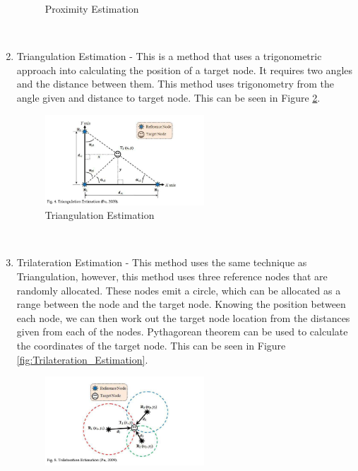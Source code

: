 \documentclass{report}
\begin{document}
\begin{enumerate}
\begin{figure}[h!]
    \caption{Proximity Estimation\cite{IndoorTrackingRSSI}}
    \label{fig:Proximity Estimation Diagram}
\end{figure} \\
    \item Triangulation Estimation - This is a method that uses a trigonometric approach into calculating the position of a target node. It requires two angles and the distance between them. This method uses trigonometry from the angle given and distance to target node. This can be seen in Figure \ref{fig:Triangulation Estimation Diagram}.
\begin{figure}[h!]
    \centering
    \includegraphics[width=225]{Triangulation_estimation.PNG} 
    \caption{Triangulation Estimation\cite{IndoorTrackingRSSI}}
    \label{fig:Triangulation Estimation Diagram}
\end{figure} \\
    \item Trilateration Estimation - This method uses the same technique as Triangulation, however, this method uses three reference nodes that are randomly allocated. These nodes emit a circle, which can be allocated as a range between the node and the target node. Knowing the position between each node, we can then work out the target node location from the distances given from each of the nodes. Pythagorean theorem can be used to calculate the coordinates of the target node. This can be seen in Figure \ref{fig:Trilateration_Estimation}. \\ 
\begin{figure}[h!]
    \centering
    \includegraphics[width=225]{Trilateration_Estimation.PNG} 

\end{figure}
\end{enumerate}
\end{document}
